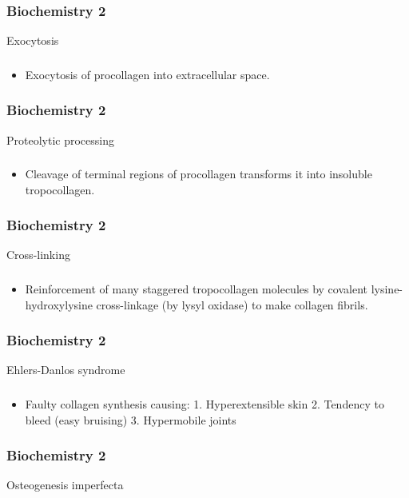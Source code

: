 \documentclass[11pt]{beamer}
\begin{document}
\begin{frame}
 \frametitle{Biochemistry 2}
Exocytosis
\end{frame}

\begin{frame}
 \frametitle{}
\begin{itemize}
\item Exocytosis of procollagen into extracellular space.
\end{itemize}
\end{frame}

\begin{frame}
 \frametitle{Biochemistry 2}
Proteolytic processing
\end{frame}

\begin{frame}
 \frametitle{}
\begin{itemize}
\item Cleavage of terminal regions of procollagen transforms it into insoluble tropocollagen.
\end{itemize}
\end{frame}

\begin{frame}
 \frametitle{Biochemistry 2}
Cross-linking
\end{frame}

\begin{frame}
 \frametitle{}
\begin{itemize}
\item Reinforcement of many staggered tropocollagen molecules by covalent lysine-hydroxylysine cross-linkage (by lysyl oxidase) to make collagen fibrils.
\end{itemize}
\end{frame}

\begin{frame}
 \frametitle{Biochemistry 2}
Ehlers-Danlos syndrome
\end{frame}

\begin{frame}
 \frametitle{}
\begin{itemize}
\item Faulty collagen synthesis causing: 1. Hyperextensible skin 2. Tendency to bleed (easy bruising) 3. Hypermobile joints
\end{itemize}
\end{frame}

\begin{frame}
 \frametitle{Biochemistry 2}
Osteogenesis imperfecta
\end{frame}
\end{document}
